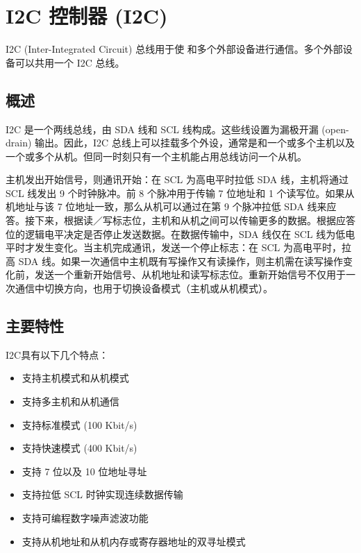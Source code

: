 \documentclass[main\_\_CN.tex]{subfiles}
\begin{document}

\ifglobal
\else
    {\let\clearpage\relax \listoftodos}
    \tableofcontents
\fi



\hypertarget{i2c}{}
\chapter{I2C 控制器 (I2C)}
\label{mod:i2c}



I2C (Inter-Integrated Circuit) 总线用于使 \chipname{} 和多个外部设备进行通信。多个外部设备可以共用一个 I2C 总线。


\section{概述}
I2C 是一个两线总线，由 SDA 线和 SCL 线构成。这些线设置为漏极开漏 (open-drain) 输出。因此，I2C 总线上可以挂载多个外设，通常是和一个或多个主机以及一个或多个从机。但同一时刻只有一个主机能占用总线访问一个从机。

主机发出开始信号，则通讯开始：在 SCL 为高电平时拉低 SDA 线，主机将通过 SCL 线发出 9 个时钟脉冲。前 8 个脉冲用于传输 7 位地址和 1 个读写位。如果从机地址与该 7 位地址一致，那么从机可以通过在第 9 个脉冲拉低 SDA 线来应答。接下来，根据读／写标志位，主机和从机之间可以传输更多的数据。根据应答位的逻辑电平决定是否停止发送数据。在数据传输中，SDA 线仅在 SCL 线为低电平时才发生变化。当主机完成通讯，发送一个停止标志：在 SCL 为高电平时，拉高 SDA 线。如果一次通信中主机既有写操作又有读操作，则主机需在读写操作变化前，发送一个重新开始信号、从机地址和读写标志位。重新开始信号不仅用于一次通信中切换方向，也用于切换设备模式（主机或从机模式）。

\section{主要特性}

I2C具有以下几个特点：

\begin{itemize}
    \item 支持主机模式和从机模式
    \item 支持多主机和从机通信
    \item 支持标准模式 (100 Kbit/s)
    \item 支持快速模式 (400 Kbit/s)
    \item 支持 7 位以及 10 位地址寻址
    \item 支持拉低 SCL 时钟实现连续数据传输
    \item 支持可编程数字噪声滤波功能
    \item 支持从机地址和从机内存或寄存器地址的双寻址模式
\end{itemize}
\end{document}
